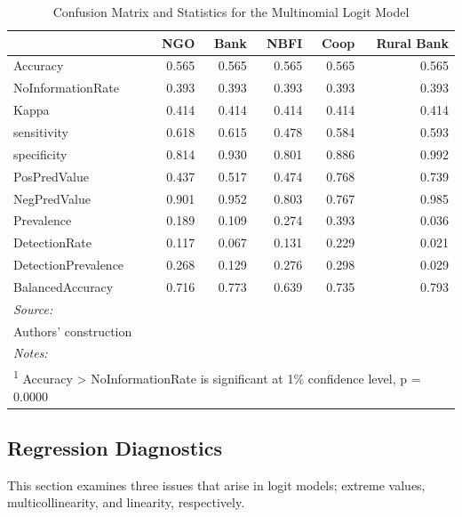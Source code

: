 \documentclass[a4paper, nobind]{templates/ociamthesis}
\begin{document}
\begin{table}

\caption{\label{tab:unnamed-chunk-45}Confusion Matrix and Statistics for the Multinomial Logit Model}
\centering
\begin{tabular}[t]{lrrrrr}
\toprule
  & NGO & Bank & NBFI & Coop & Rural Bank\\
\midrule
Accuracy & 0.565 & 0.565 & 0.565 & 0.565 & 0.565\\
NoInformationRate & 0.393 & 0.393 & 0.393 & 0.393 & 0.393\\
Kappa & 0.414 & 0.414 & 0.414 & 0.414 & 0.414\\
sensitivity & 0.618 & 0.615 & 0.478 & 0.584 & 0.593\\
specificity & 0.814 & 0.930 & 0.801 & 0.886 & 0.992\\
\addlinespace
PosPredValue & 0.437 & 0.517 & 0.474 & 0.768 & 0.739\\
NegPredValue & 0.901 & 0.952 & 0.803 & 0.767 & 0.985\\
Prevalence & 0.189 & 0.109 & 0.274 & 0.393 & 0.036\\
DetectionRate & 0.117 & 0.067 & 0.131 & 0.229 & 0.021\\
DetectionPrevalence & 0.268 & 0.129 & 0.276 & 0.298 & 0.029\\
\addlinespace
BalancedAccuracy & 0.716 & 0.773 & 0.639 & 0.735 & 0.793\\
\bottomrule
\multicolumn{6}{l}{\rule{0pt}{1em}\textit{Source: }}\\
\multicolumn{6}{l}{\rule{0pt}{1em}Authors' construction}\\
\multicolumn{6}{l}{\rule{0pt}{1em}\textit{Notes: }}\\
\multicolumn{6}{l}{\rule{0pt}{1em}\textsuperscript{1} Accuracy > NoInformationRate is significant at 1\% confidence level, p = 0.0000}\\
\end{tabular}
\end{table}

\newpage

\hypertarget{regression-diagnostics}{%
\subsection{Regression Diagnostics}\label{regression-diagnostics}}

This section examines three issues that arise in logit models; extreme values, multicollinearity, and linearity, respectively.
\end{document}
